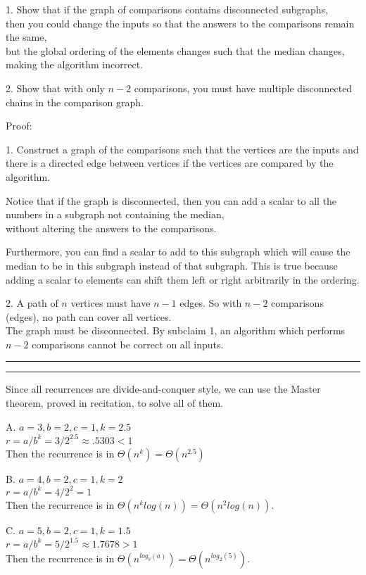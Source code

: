 \documentclass[11pt,letterpaper]{article}
\newcommand{\question}[1] {\vspace{.25in} \hrule\vspace{0.5em}
\noindent{\bf #1} \vspace{0.5em}
\hrule \vspace{.10in}}
\begin{document}
1. Show that if the graph of comparisons contains disconnected subgraphs,\\
then you could change the inputs so that the answers to the comparisons remain the same,\\
but the global ordering of the elements changes such that the median changes, making the algorithm incorrect.

2. Show that with only $n-2$ comparisons, you must have multiple disconnected chains in the comparison graph.

Proof:

1. Construct a graph of the comparisons such that the vertices are the inputs and there is a directed edge
between vertices if the vertices are compared by the algorithm.

Notice that if the graph is disconnected, then you can add a scalar to all the numbers in a subgraph not containing the median, \\
without altering the answers to the comparisons.

Furthermore, you can find a scalar to add to this subgraph which will cause the median to be in this subgraph instead of that subgraph.
This is true because adding a scalar to elements can shift them left or right arbitrarily in the ordering.

2. A path of $n$ vertices must have $n-1$ edges. So with $n-2$ comparisons (edges), no path can cover all vertices.\\
The graph must be disconnected. By subclaim 1, an algorithm which performs $n-2$ comparisons cannot be correct on all inputs.

\question{1d.}
Since all recurrences are divide-and-conquer style, we can use the Master theorem, proved in recitation, to solve all of them.

A. $a=3, b=2, c=1, k=2.5$\\
$r = a/b^{k} = 3/2^{2.5} \approx .5303 < 1$\\
Then the recurrence is in $\Theta(n^k) = \Theta(n^{2.5})$

B. $a=4, b=2, c=1, k=2$\\
$r = a/b^{k} = 4/2^{2} = 1$\\
Then the recurrence is in $\Theta(n^k log(n)) = \Theta(n^{2} log(n))$.

C. $a=5, b=2, c=1, k=1.5$\\
$r = a/b^{k} = 5/2^{1.5} \approx 1.7678 > 1$\\
Then the recurrence is in $\Theta(n^{log_b(a)}) = \Theta(n^{log_2(5)})$.
\end{document}
